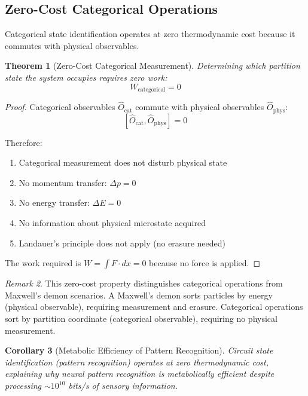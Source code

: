 \documentclass[aps,prd,twocolumn,superscriptaddress,floatfix,nofootinbib]{revtex4-2}
\newtheorem{theorem}{Theorem}[section]
\newtheorem{corollary}[theorem]{Corollary}
\theoremstyle{remark}
\newtheorem{remark}[theorem]{Remark}
\begin{document}
\subsection{Zero-Cost Categorical Operations}

Categorical state identification operates at zero thermodynamic cost because it commutes with physical observables.

\begin{theorem}[Zero-Cost Categorical Measurement]
\label{thm:zero_cost_categorical}
Determining which partition state the system occupies requires zero work:
\begin{equation}
W_{\text{categorical}} = 0
\end{equation}
\end{theorem}

\begin{proof}
Categorical observables $\hat{O}_{\text{cat}}$ commute with physical observables $\hat{O}_{\text{phys}}$:
$$
[\hat{O}_{\text{cat}}, \hat{O}_{\text{phys}}] = 0
$$

Therefore:
\begin{enumerate}
\item Categorical measurement does not disturb physical state
\item No momentum transfer: $\Delta p = 0$
\item No energy transfer: $\Delta E = 0$
\item No information about physical microstate acquired
\item Landauer's principle does not apply (no erasure needed)
\end{enumerate}

The work required is $W = \int F \cdot dx = 0$ because no force is applied.
\end{proof}

\begin{remark}
This zero-cost property distinguishes categorical operations from Maxwell's demon scenarios. A Maxwell's demon sorts particles by energy (physical observable), requiring measurement and erasure. Categorical operations sort by partition coordinate (categorical observable), requiring no physical measurement.
\end{remark}

\begin{corollary}[Metabolic Efficiency of Pattern Recognition]
\label{cor:pattern_efficiency}
Circuit state identification (pattern recognition) operates at zero thermodynamic cost, explaining why neural pattern recognition is metabolically efficient despite processing $\sim 10^{10}$ bits/s of sensory information.
\end{corollary}
\end{document}
